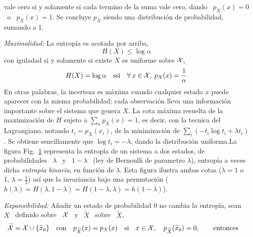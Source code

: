 \begin{propiedades}
  vale cero si y solamente si cada termino de la suma vale cero, dando \ $p_X(x)
  =  0$ \  o \  $p_X(x) =  1$. Se  concluye $p_X$  siendo una  distribuci\'on de
  probabilidad, sumando a 1.
%
\setcounter{PropCotamaxima}{\value{enumi}}
\item\label{prop:SZ:cotamaxima} {\it Maximalidad:}  La entrop\'ia es acotada por
  arriba,
  \[
  H(X) \le \log \alpha
  \]
  con iguladad si y solamente si existe $X$ es uniforme sobre $\mathcal{X}$, \ie
  \[
  H(X) =  \log \alpha \quad \mbox{ssi}  \quad \forall \,  x \in \mathcal{X}, \:  p_X(x) =
  \frac{1}{\alpha}
  \]
  En otras palabras, la incerteza  es m\'axima cuando cualquier estado $x$ puede
  aparecer con la misma probabilidad; cada observaci\'on lleva una informaci\'on
  importante sobre el  sistema que genera $X$.  La cota  m\'axima resuelta de la
  maximizaci\'on de $H$  sujeto a $\sum_x p_X(x) = 1$, es  decir, con la tecnica
  del Lagrangiano, notando $t_i =  p_X(x_i)$, de la minimizaci\'on de $\sum_i (-
  t_i  \log t_i  + \lambda  t_i)$.   Se obtiene  sencillamente que  $\log t_i  =
  -\lambda$,    dando   la    distribuci\'on    uniforma.\newline   La    figura
  Fig.~\ref{fig:SZ:EntropiaBinaria} representa la entrop\'ia de un sistema a dos
  estados, de probabilidades  \ $\lambda$ \ y \ $1-\lambda$  \ (ley de Bernoulli
  de parametro $\lambda$), entrop\'ia a veces dicha {\it entrop\'ia binaria}, en
  funci\'on de $\lambda$.   Esta figura ilustra ambas cotas ($\lambda  = 1$ o 1,
  $\lambda  =  \frac12$)  as\'i   que  la  invariancia  bajo  una  permutaci\'on
  ($h(\lambda) = H(\lambda,1-\lambda) = H(1-\lambda,\lambda) = h(1-\lambda)$).
  \begin{figure}[h!]
  \begin{center}\end{center}
  \label{fig:SZ:EntropiaBinaria}
  \end{figure}
%
\item\label{prop:SZ:expansabilidad} {\it Expansibilidad:}  A\~nadir un estado de
  probabilidad 0 no cambia la entrop\'ia, \ie sean \ $X$ \ definido sobre \ $\mathcal{X}$
  \ y \ $\widetilde{X}$ \ sobre \ $\widetilde{X}$,
  \[
  \widetilde{\mathcal{X}}  =  \mathcal{X}  \cup  \{  \widetilde{x}_0  \}  \quad  \mbox{con}  \quad
  p_{\widetilde{X}}(x)  =   p_X(x)  \quad  \mbox{si}  \quad  x   \in  \mathcal{X},  \quad
  p_{\widetilde{X}}(\widetilde{x}_0)   =   0,   \qquad   \mbox{entonces}   \quad
\]
\end{propiedades}
